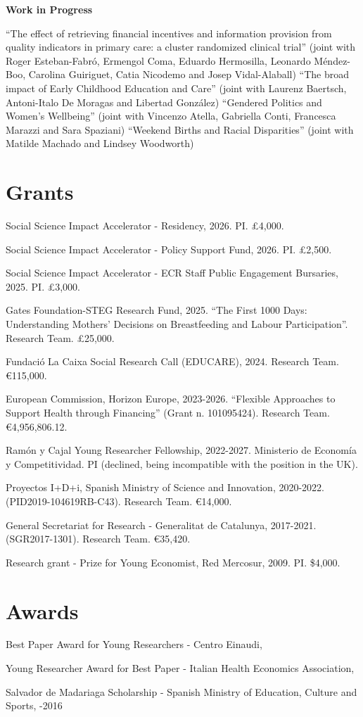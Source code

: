 \documentclass[letterpaper]{article}
\renewenvironment{itemize}{
  \begin{list}{}{
    \setlength{\leftmargin}{1.5em}
  }
}{
  \end{list}
}
\newcommand{\cvIfBlank}[3]{\if\relax\detokenize{#1}\relax#2\else#3\fi}
\newcommand{\cvgrant}[3]{\item #2, #1. #3}
\newcommand{\cvaward}[4]{\item #1 - #2, \cvIfBlank{#4}{#3}{#4}}
\begin{document}
\begin{itemize}
\leftskip 0in
\item {\bf Work in Progress}

\leftskip 0.25in
\parindent -0.5in
\subitem ``The effect of retrieving financial incentives and information provision from quality indicators in primary care: a cluster randomized clinical trial'' (joint with Roger Esteban-Fabró, Ermengol Coma, Eduardo Hermosilla, Leonardo Méndez-Boo, Carolina Guiriguet, Catia Nicodemo and Josep Vidal-Alaball)
\subitem ``The broad impact of Early Childhood Education and Care'' (joint with Laurenz Baertsch, Antoni-Italo De Moragas and Libertad Gonz\'{a}lez)
\subitem ``Gendered Politics and Women's Wellbeing'' (joint with Vincenzo Atella, Gabriella Conti, Francesca Marazzi and Sara Spaziani)
\subitem ``Weekend Births and Racial Disparities'' (joint with Matilde Machado and Lindsey Woodworth)
\end{itemize}

\section*{Grants}
\begin{itemize}
	\cvgrant{2026}{Social Science Impact Accelerator - Residency}{PI. \pounds4,000.}
	\cvgrant{2026}{Social Science Impact Accelerator - Policy Support Fund}{PI. \pounds2,500.}
	\cvgrant{2025}{Social Science Impact Accelerator - ECR Staff Public Engagement Bursaries}{PI. \pounds3,000.}
	\cvgrant{2025}{Gates Foundation-STEG Research Fund}{``The First 1000 Days: Understanding Mothers' Decisions on Breastfeeding and Labour Participation''. Research Team. \pounds25,000.}
	\cvgrant{2024}{Fundaci\'{o} La Caixa Social Research Call (EDUCARE)}{Research Team. \euro{115,000}.}
	\cvgrant{2023-2026}{European Commission, Horizon Europe}{``Flexible Approaches to Support Health through Financing'' (Grant n. 101095424). Research Team. \euro{4,956,806.12}.}
	\cvgrant{2022-2027}{Ram\'{o}n y Cajal Young Researcher Fellowship}{Ministerio de Econom\'{i}a y Competitividad. PI (declined, being incompatible with the position in the UK).}
	\cvgrant{2020-2022}{Proyectos I+D+i, Spanish Ministry of Science and Innovation}{(PID2019-104619RB-C43). Research Team. \euro{14,000}.}
	\cvgrant{2017-2021}{General Secretariat for Research - Generalitat de Catalunya}{(SGR2017-1301). Research Team. \euro{35,420}.}
	\cvgrant{2009}{Research grant - Prize for Young Economist, Red Mercosur}{PI. \$4,000.}
\end{itemize}

\section*{Awards}
\begin{itemize}
	\cvaward{Best Paper Award for Young Researchers}{Centro Einaudi}{2018}{}
	\cvaward{Young Researcher Award for Best Paper}{Italian Health Economics Association}{2015}{}
	\cvaward{Salvador de Madariaga Scholarship}{Spanish Ministry of Education, Culture and Sports}{2012}{2012-2016}
\end{itemize}
\end{document}

